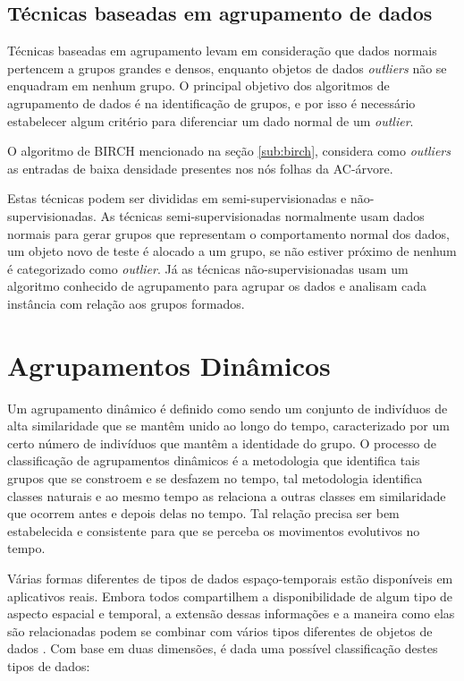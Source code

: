 \subsection{Técnicas baseadas em agrupamento de dados}
Técnicas baseadas em agrupamento levam em consideração que dados normais pertencem a grupos grandes e densos, enquanto objetos de dados \textit{outliers} não se enquadram em nenhum grupo. O principal objetivo dos algoritmos de agrupamento de dados é na identificação de grupos, e por isso é necessário estabelecer algum critério para diferenciar um dado normal de um \textit{outlier}.

O algoritmo de \acrshort{BIRCH} \cite{Zhang1996} mencionado na seção \ref{sub:birch}, considera como \textit{outliers} as entradas de baixa densidade presentes nos nós folhas da AC-árvore.

Estas técnicas podem ser divididas em semi-supervisionadas e não-supervisionadas. As técnicas semi-supervisionadas normalmente usam dados normais para gerar grupos que representam o comportamento normal dos dados, um objeto novo de teste é alocado a um grupo, se não estiver próximo de nenhum é categorizado como \textit{outlier}. Já as técnicas não-supervisionadas usam um algoritmo conhecido de agrupamento para agrupar os dados e analisam cada instância com relação aos grupos formados.

\section{Agrupamentos Dinâmicos}
Um agrupamento dinâmico é definido como sendo um conjunto de indivíduos de alta similaridade que se mantêm unido ao longo do tempo, caracterizado por um certo número de indivíduos que mantêm a identidade do grupo. O processo de classificação de agrupamentos dinâmicos é a metodologia que identifica tais grupos que se constroem e se desfazem no tempo, tal metodologia identifica classes naturais e ao mesmo tempo as relaciona a outras classes em similaridade que ocorrem antes e depois delas no tempo. Tal relação precisa ser bem estabelecida e consistente para que se perceba os movimentos evolutivos no tempo.

Várias formas diferentes de tipos de dados espaço-temporais estão disponíveis em aplicativos reais. Embora todos compartilhem a disponibilidade de algum tipo de aspecto espacial e temporal, a extensão dessas informações e a maneira como elas são relacionadas podem se combinar com vários tipos diferentes de objetos de dados \cite{Kisilevich2009}. Com base em duas dimensões, é dada uma possível classificação destes tipos de dados:

